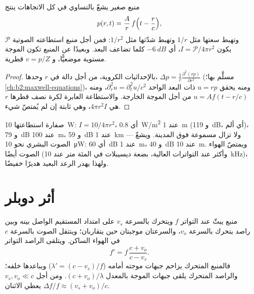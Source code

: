 \begin{proposition}\label{prop:b2:sound-waves:spherical}
منبع صغير يشعّ بالتساوي في كل الاتجاهات ينتج 
\[
p(r, t) = \frac{A}{r}\,f\Bigl(t - \frac rc\Bigr) ,
\]
وتهبط سعتها مثل $1/r$ وتهبط شدّتها مثل $1/r^2$:
فمن أجل منبع استطاعته الصوتية $\mathcal P$ يكون $I = \mathcal P/4\pi r^2$، أي
$-\qty{6}{dB}$ كلما تضاعف البعد. وبعيدًا عن المنبع تكون
الموجة مستوية موضعيًّا، و $v = p/Z$ قطرية.
\end{proposition}

\begin{proof}
بالإحداثيات الكروية، من أجل دالة في $r$ وحدها، $\Delta p =
\frac1r\frac{\partial^2(rp)}{\partial r^2}$ (مسلَّم بها؛ \cref{ch:b2:maxwell-equations})،
ومنه يحقق $u = rp$  ذات البعد الواحد $\partial_r^2u = \partial_t^2u/c^2$،
ومنه $u = Af(t - r/c)$ من أجل الموجة الخارجة. والاستطاعة العابرة
لكرة نصف قطرها $r$ هي $4\pi r^2I$، وهي ثابتة إن لم يُمتصّ شيء.
\end{proof}

\begin{example}\label{ex:b2:sound-waves:siren}
صفارة استطاعتها \qty{10}{W}: $I = 10/4\pi r^2$، أي \qty{0.8}{W/m^2} عند \qty{1}{m} (و \qty{119}{dB}،
أي ألم)، و \qty{79}{dB} عند \qty{100}{m}، و \qty{59}{dB} عند \qty{1}{km} --- ولا تزال مسموعة فوق
المدينة. ويشعّ الصوت البشري نحو \qty{10}{\micro W}: أي \qty{60}{dB} عند \qty{1}{m}،
و \qty{40}{dB} عند \qty{10}{m}. ويمتصّ الهواء الصوت أيضًا (وأكثر عند
التواترات العالية، بضعة ديسيبلات في المئة متر عند \qty{10}{kHz})، ولهذا
يهدر الرعد البعيد هديرًا خفيضًا.
\end{example}

\section{أثر دوبلر}

\begin{theorem}\label{thm:b2:sound-waves:doppler}
منبع يبثّ عند التواتر $f$ ويتحرك بالسرعة $v_s$ على امتداد
المستقيم الواصل بينه وبين راصد يتحرك بالسرعة $v_o$، والسرعتان
موجبتان حين يتقاربان؛ وينتقل الصوت بالسرعة $c$ في
الهواء الساكن. ويتلقى الراصد التواتر
\[
f' = f\,\frac{c + v_o}{c - v_s} .
\]
فالمنبع المتحرك يزاحم جبهات موجته أمامه ($\lambda' = (c - v_s)/f$)
ويباعدها خلفه؛ والراصد المتحرك يلقى جبهات الموجة
بالمعدل $(c + v_o)/\lambda$. ومن أجل $v_s, v_o \ll c$ يعطي الاثنان $\Delta f/f \approx
(v_s + v_o)/c$.
\end{theorem}


